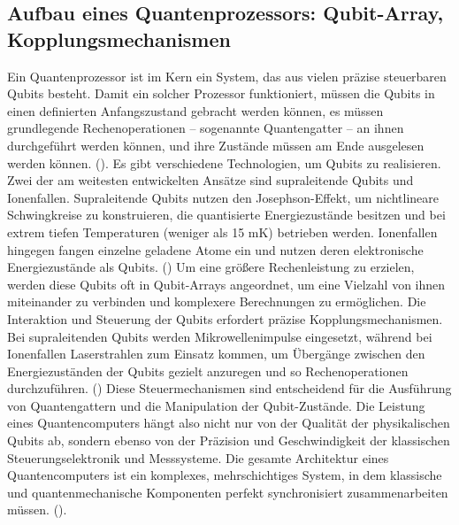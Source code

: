 \subsection{Aufbau eines Quantenprozessors: Qubit-Array, Kopplungsmechanismen}
Ein Quantenprozessor ist im Kern ein System, das aus vielen präzise steuerbaren Qubits besteht. Damit ein solcher Prozessor funktioniert, müssen die Qubits in einen definierten Anfangszustand gebracht werden können, es müssen grundlegende Rechenoperationen – sogenannte Quantengatter – an ihnen durchgeführt werden können, und ihre Zustände müssen am Ende ausgelesen werden können. (\cite{WasIstQuantencomputing}).
Es gibt verschiedene Technologien, um Qubits zu realisieren. Zwei der am weitesten entwickelten Ansätze sind supraleitende Qubits und Ionenfallen. Supraleitende Qubits nutzen den Josephson-Effekt, um nichtlineare Schwingkreise zu konstruieren, die quantisierte Energiezustände besitzen und bei extrem tiefen Temperaturen (weniger als 15 mK) betrieben werden. Ionenfallen hingegen fangen einzelne geladene Atome ein und nutzen deren elektronische Energiezustände als Qubits. (\cite{qtPrimaerQubitsBasisbausteineFuer2025}) Um eine größere Rechenleistung zu erzielen, werden diese Qubits oft in Qubit-Arrays angeordnet, um eine Vielzahl von ihnen miteinander zu verbinden und komplexere Berechnungen zu ermöglichen.
Die Interaktion und Steuerung der Qubits erfordert präzise Kopplungsmechanismen. Bei supraleitenden Qubits werden Mikrowellenimpulse eingesetzt, während bei Ionenfallen Laserstrahlen zum Einsatz kommen, um Übergänge zwischen den Energiezuständen der Qubits gezielt anzuregen und so Rechenoperationen durchzuführen. (\cite{boterSpiderwebArraySparse2022}) Diese Steuermechanismen sind entscheidend für die Ausführung von Quantengattern und die Manipulation der Qubit-Zustände. Die Leistung eines Quantencomputers hängt also nicht nur von der Qualität der physikalischen Qubits ab, sondern ebenso von der Präzision und Geschwindigkeit der klassischen Steuerungselektronik und Messsysteme. Die gesamte Architektur eines Quantencomputers ist ein komplexes, mehrschichtiges System, in dem klassische und quantenmechanische Komponenten perfekt synchronisiert zusammenarbeiten müssen. (\cite{WasIstQuantencomputing}).
